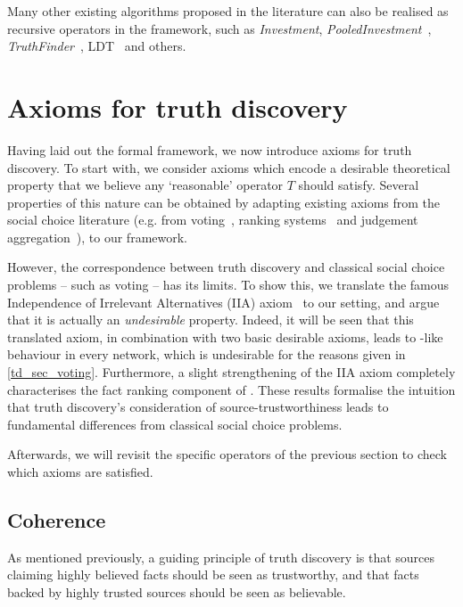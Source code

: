
Many other existing algorithms proposed in the literature can also be realised
as recursive operators in the framework, such as \emph{Investment},
\emph{PooledInvestment}~\cite{pasternack2010},
\emph{TruthFinder}~\cite{yin2008}, LDT~\cite{zhang2018} and others.

\section{Axioms for truth discovery}
\label{td_sec_axioms}

Having laid out the formal framework, we now introduce axioms for truth
discovery. To start with, we consider axioms which encode a desirable
theoretical property that we believe any `reasonable' operator $T$ should
satisfy.
%
Several properties of this nature can be obtained by adapting existing
axioms from the social choice literature (e.g. from
voting~\cite{brandt2016introduction}, ranking
systems~\cite{tennenholtz2004,altman2008} and judgement
aggregation~\cite{endriss2016ja}), to our framework.

However, the correspondence between truth discovery and classical social choice
problems -- such as voting -- has its limits. To show this, we translate the
famous Independence of Irrelevant Alternatives (IIA) axiom~\cite{arrow1952} to
our setting, and argue that it is actually an \emph{undesirable} property.
Indeed, it will be seen that this translated axiom, in combination with two
basic desirable axioms, leads to \voting{}-like behaviour in every network,
which is undesirable for the reasons given in \cref{td_sec_voting}.
Furthermore, a slight strengthening of the IIA axiom completely characterises
the fact ranking component of \voting{}. These results formalise the intuition
that truth discovery's consideration of source-trustworthiness leads to
fundamental differences from classical social choice problems.

Afterwards, we will revisit the specific operators of the previous section to
check which axioms are satisfied.

\subsection{Coherence}

As mentioned previously, a guiding principle of truth discovery is that sources
claiming highly believed facts should be seen as trustworthy, and that facts
backed by highly trusted sources should be seen as believable.

